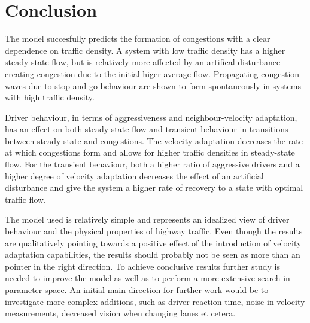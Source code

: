 \documentclass[11pt,a4paper,twocolumn]{article}
\begin{document}
\section{Conclusion}
The model succesfully predicts the formation of congestions with a clear dependence on traffic density. A system with low traffic density has a higher steady-state flow, but is relatively more affected by an artifical disturbance creating congestion due to the initial higer average flow. Propagating congestion waves due to stop-and-go behaviour are shown to form spontaneously in systems with high traffic density. 

Driver behaviour, in terms of aggressiveness and neighbour-velocity adaptation, has an effect on both steady-state flow and transient behaviour in transitions between steady-state and congestions. The velocity adaptation decreases the rate at which congestions form and allows for higher traffic densities in steady-state flow. For the transient behaviour, both a higher ratio of aggressive drivers and a higher degree of velocity adaptation decreases the effect of an artificial disturbance and give the system a higher rate of recovery to a state with optimal traffic flow.

The model used is relatively simple and represents an idealized view of driver behaviour and the physical properties of highway traffic. Even though the results are qualitatively pointing towards a positive effect of the introduction of velocity adaptation capabilities, the results should probably not be seen as more than an pointer in the right direction. To achieve conclusive results further study is needed to improve the model as well as to perform a more extensive search in parameter space. An initial main direction for further work would be to investigate more complex additions, such as driver reaction time, noise in velocity measurements, decreased vision when changing lanes et cetera.






\end{document}
